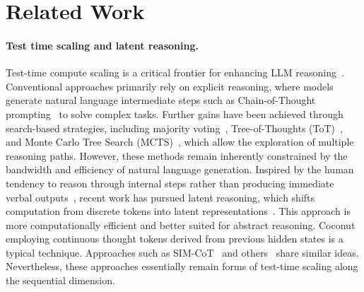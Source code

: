 
\section{Related Work}
\paragraph{Test time scaling and latent reasoning.}
Test-time compute scaling is a critical frontier for enhancing LLM reasoning~\citep{zhang2025survey}.
Conventional approaches primarily rely on explicit reasoning, where models generate natural language intermediate steps such as Chain-of-Thought prompting~\citep{wei2022chain} to solve complex tasks. 
 Further gains have been achieved through search-based strategies, including majority voting~\citep{wang2022selfconsistency}, Tree-of-Thoughts (ToT)~\citep{tot}, and Monte Carlo Tree Search (MCTS)~\cite{yang2022chain}, which allow the exploration of multiple reasoning paths. However, these methods remain inherently constrained by the bandwidth and efficiency of natural language generation.
Inspired by the human tendency to reason through internal steps rather than producing immediate verbal outputs~\citep{zelikman2024quiet}, recent work has pursued latent reasoning, which shifts computation from discrete tokens into latent representations~\citep{zhu2025survey}.  This approach is more computationally efficient and better suited for abstract reasoning.
Coconut~\citep{hao2024training} employing continuous thought tokens derived from previous hidden states is a typical technique. 
 Approaches such as SIM-CoT~\citep{wei2025sim} and others~\citep{mohtashami2023cotformer,shen2025codi,cheng2024compressed,zhang2025lightthinker} share similar ideas. Nevertheless, these approaches essentially remain forms of test-time scaling along the sequential dimension.
